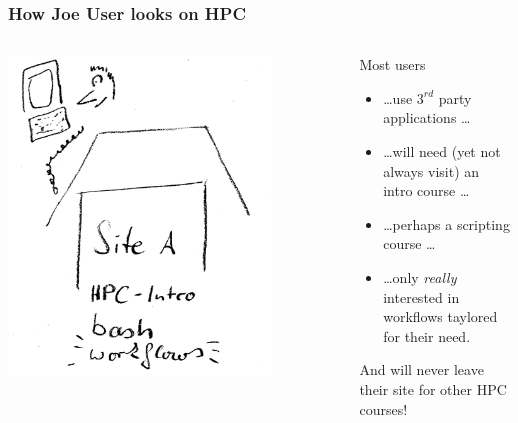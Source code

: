 \begin{frame}
  \frametitle{How Joe User looks on HPC}
  \begin{columns}
   
  \begin{column}{.5\textwidth}
    \centering
  \includegraphics[width=0.8\textwidth]{images/joe}
   \end{column}
  

   \begin{column}{.5\textwidth}
    \pause
    Most users
    \begin{itemize}[<+->]
     \item \ldots use $3^{rd}$ party applications \ldots
     \item \ldots will need (yet not always visit) an intro course \ldots
     \item \ldots perhaps a scripting course \ldots
     \item \ldots only \emph{really} interested in workflows taylored for their need.
    \end{itemize}
    \pause
    And will never leave their site for other HPC courses!
   \end{column}
   \end{columns}

\end{frame}

